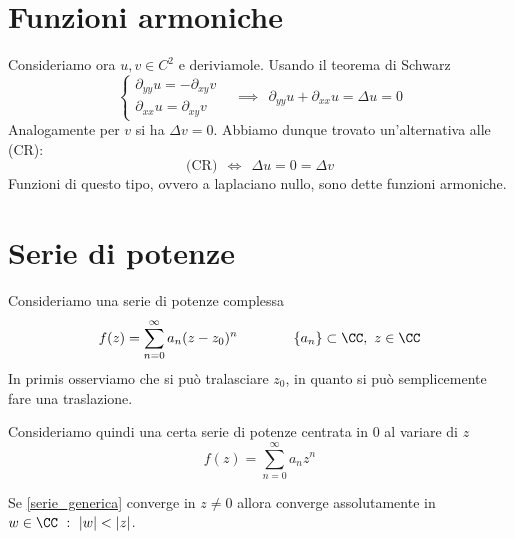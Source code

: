 \section{Funzioni armoniche}

Consideriamo ora $u, v\in C^{2}$ e deriviamole. Usando il teorema di Schwarz
\begin{equation*}
\begin{cases}
\partial_{yy} u = - \partial_{xy} v\ \ \ \ \\
\partial_{xx} u = \partial_{xy} v
\end{cases} \implies \ \ \partial_{yy} u + \partial_{xx} u = \Delta u = 0
\end{equation*}
Analogamente per $v$ si ha $\Delta v = 0$. Abbiamo dunque trovato un'alternativa alle (CR):
$$
\text{(CR)} \ \ \iff \ \ \Delta u = 0 = \Delta v
$$
Funzioni di questo tipo, ovvero a laplaciano nullo, sono dette funzioni armoniche.

\newpage

\section{Serie di potenze}

Consideriamo una serie di potenze complessa
\begin{equation*}
f(z) = \sum\limits^{\infty}_{n = 0} a_{n}(z - z_{0})^{n}\qquad\qquad\{a_{n}\} \subset \CC,\ z\in \CC
\end{equation*}
In primis osserviamo che si può tralasciare $z_{0}$, in quanto si può semplicemente fare una traslazione. 

Consideriamo quindi una certa serie di potenze centrata in $0$ al variare di $z$
\begin{equation}
\label{serie_generica}
f(z) = \sum\limits^{\infty}_{n = 0} a_{n} z^{n}
\end{equation}

\begin{thm}
Se \eqref{serie_generica} converge in $z \neq 0$ allora converge assolutamente in $w\in\CC\ :\ |w|<|z|$.
\end{thm}

